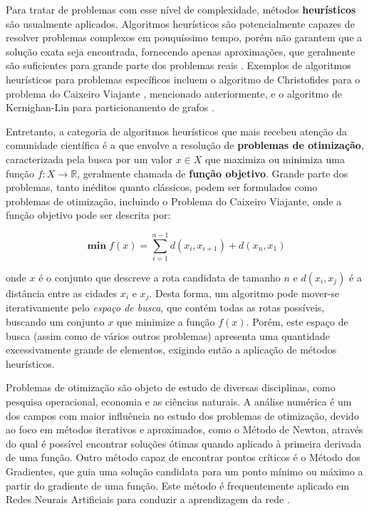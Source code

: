 \documentclass[12pt]{article}
\begin{document}
Para tratar de problemas com esse nível de complexidade, métodos \textbf{heurísticos} são usualmente aplicados. Algoritmos heurísticos são potencialmente capazes de resolver problemas complexos em pouquíssimo tempo, porém não garantem que a solução exata seja encontrada, fornecendo apenas aproximações, que geralmente são suficientes para grande parte dos problemas reais \cite{Kokash2005}. Exemplos de algoritmos heurísticos para problemas específicos incluem o algoritmo de Christofides para o problema do Caixeiro Viajante \cite{Christofides1976}, mencionado anteriormente, e o algoritmo de Kernighan-Lin para particionamento de grafos \cite{Kernighan1970}.

Entretanto, a categoria de algoritmos heurísticos que mais recebeu atenção da comunidade científica é a que envolve a resolução de \textbf{problemas de otimização}, caracterizada pela busca por um valor $x \in X$ que maximiza ou minimiza uma função $f: X \rightarrow \mathbb{R}$, geralmente chamada de \textbf{função objetivo}. Grande parte dos problemas, tanto inéditos quanto clássicos, podem ser formulados como problemas de otimização, incluindo o Problema do Caixeiro Viajante, onde a função objetivo pode ser descrita por:

\begin{equation} \label{eq:tsp}
    \mathop{\boldsymbol\min} f(x) = \sum_{i = 1}^{n - 1} d(x_{i}, x_{i + 1}) + d(x_{n}, x_{1})
\end{equation}

\noindent onde $x$ é o conjunto que descreve a rota candidata de tamanho $n$ e $d(x_{i}, x_{j})$ é a distância entre as cidades $x_{i}$ e $x_{j}$. Desta forma, um algoritmo pode mover-se iterativamente pelo \textit{espaço de busca}, que contém todas as rotas possíveis, buscando um conjunto $x$ que minimize a função $f(x)$. Porém, este espaço de busca (assim como de vários outros problemas) apresenta uma quantidade excessivamente grande de elementos, exigindo então a aplicação de métodos heurísticos.

Problemas de otimização são objeto de estudo de diversas disciplinas, como pesquisa operacional, economia e as ciências naturais. A análise numérica é um dos campos com maior influência no estudo dos problemas de otimização, devido ao foco em métodos iterativos e aproximados, como o Método de Newton, através do qual é possível encontrar soluções ótimas quando aplicado à primeira derivada de uma função. Outro método capaz de encontrar pontos críticos é o Método dos Gradientes, que guia uma solução candidata para um ponto mínimo ou máximo a partir do gradiente de uma função. Este método é frequentemente aplicado em Redes Neurais Artificiais para conduzir a aprendizagem da rede \cite{Haykin1998}.
\end{document}
